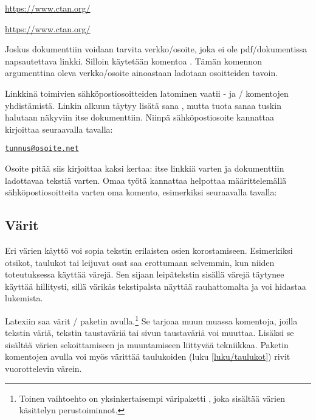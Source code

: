 \begin{koodilohkosis}
\url{https://www.ctan.org/}
\end{koodilohkosis}

\begin{tulossis}
  \url{https://www.ctan.org/}
\end{tulossis}

Joskus dokumenttiin voidaan tarvita verkko\-/osoite, joka ei ole
pdf\-/dokumentissa napsautettava linkki. Silloin käytetään komentoa
. Tämän komennon argumenttina oleva verkko\-/osoite
ainoastaan ladotaan osoitteiden tavoin.

Linkkinä toimivien sähköpostiosoitteiden latominen vaatii
- ja \-/ komentojen yhdistämistä.
Linkin alkuun täytyy lisätä sana , mutta tuota sanaa
tuskin halutaan näkyviin itse dokumenttiin. Niinpä sähköpostiosoite
kannattaa kirjoittaa seuraavalla tavalla:

\begin{koodilohkosis}
\href{mailto:tunnus@osoite.net}{\nolinkurl{tunnus@osoite.net}}
\end{koodilohkosis}

Osoite pitää siis kirjoittaa kaksi kertaa: itse linkkiä varten ja
dokumenttiin ladottavaa tekstiä varten. Omaa työtä kannattaa helpottaa
määrittelemällä sähköpostiosoitteita varten oma komento, esimerkiksi
seuraavalla tavalla:

\begin{koodilohkosis}
\newcommand{\sposti}[1]{\href{mailto:#1}{\nolinkurl{#1}}}
\end{koodilohkosis}

\subsection{Värit}
\label{luku/korostus-värit}

Eri värien käyttö voi sopia tekstin erilaisten osien korostamiseen.
Esimerkiksi otsikot, taulukot tai leijuvat osat saa erottumaan
selvemmin, kun niiden toteutuksessa käyttää värejä. Sen sijaan
leipätekstin sisällä värejä täytynee käyttää hillitysti, sillä värikäs
tekstipalsta näyttää rauhattomalta ja voi hidastaa lukemista.

Latexiin saa värit \-/ paketin
avulla.\footnote{Toinen vaihtoehto on yksinkertaisempi väripaketti
  , joka sisältää värien käsittelyn perustoiminnot.} Se
tarjoaa muun muassa komentoja, joilla tekstin väriä, tekstin taustaväriä
tai sivun taustaväriä voi muuttaa. Lisäksi se sisältää värien
sekoittamiseen ja muuntamiseen liittyvää tekniikkaa. Paketin komentojen
avulla voi myös värittää taulukoiden (luku \ref{luku/taulukot}) rivit
vuorottelevin värein.

